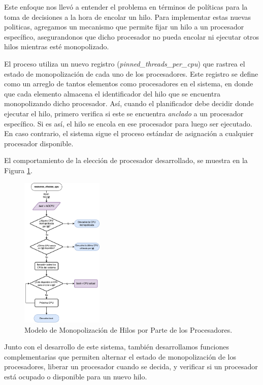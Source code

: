 Este enfoque nos llevó a entender el problema en términos de políticas para la toma de decisiones a la hora de encolar un hilo. Para implementar estas nuevas politicas, agregamos un mecanismo que permite fijar un hilo a un procesador específico, asegurandonos que dicho procesador no pueda encolar ni ejecutar otros hilos mientras esté monopolizado.

El proceso utiliza un nuevo registro (\textit{pinned\_threads\_per\_cpu}) que rastrea el estado de monopolización de cada uno de los procesadores. Este registro se define como un arreglo de tantos elementos como procesadores en el sistema, en donde que cada elemento almacena el identificador del hilo que se encuentra monopolizando dicho procesador. Así, cuando el planificador debe decidir donde ejecutar el hilo, primero verifica si este se encuentra \textit{anclado} a un procesador específico. Si es así, el hilo se encola en ese procesador para luego ser ejecutado. En caso contrario, el sistema sigue el proceso estándar de asignación a cualquier procesador disponible.

El comportamiento de la elección de procesador desarrollado, se muestra en la Figura \ref{fig:monopolization_resource-choose-cpu}.

\vspace{.50cm}
\begin{figure}[H]
    \centering
    \includegraphics[width=0.35\textwidth]{images/monopolized_choose-cpu.png}
    \caption{Modelo de Monopolización de Hilos por Parte de los Procesadores.}
    \label{fig:monopolization_resource-choose-cpu}
\end{figure}

Junto con el desarrollo de este sistema, también desarrollamos funciones complementarias que permiten alternar el estado de monopolización de los procesadores, liberar un procesador cuando se decida, y verificar si un procesador está ocupado o disponible para un nuevo hilo.

